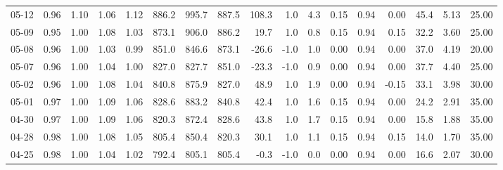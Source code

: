 \begin{threeparttable}
{\begin{tabular}{lrrrrrrrrrrrrrrrr}
  05-12 &         0.96 &           1.10 &          1.06 &          1.12 & 886.2 &  995.7 & 887.5 &      108.3 &                      1.0 &                 4.3 &       0.15 &      0.94 &           0.00 &             45.4 &            5.13 &                  25.00 \\
  05-09 &         0.95 &           1.00 &          1.08 &          1.03 & 873.1 &  906.0 & 886.2 &       19.7 &                      1.0 &                 0.8 &       0.15 &      0.94 &           0.15 &             32.2 &            3.60 &                  25.00 \\
  05-08 &         0.96 &           1.00 &          1.03 &          0.99 & 851.0 &  846.6 & 873.1 &      -26.6 &                     -1.0 &                 1.0 &       0.00 &      0.94 &           0.00 &             37.0 &            4.19 &                  20.00 \\
  05-07 &         0.96 &           1.00 &          1.04 &          1.00 & 827.0 &  827.7 & 851.0 &      -23.3 &                     -1.0 &                 0.9 &       0.00 &      0.94 &           0.00 &             37.7 &            4.40 &                  25.00 \\
  05-02 &         0.96 &           1.00 &          1.08 &          1.04 & 840.8 &  875.9 & 827.0 &       48.9 &                      1.0 &                 1.9 &       0.00 &      0.94 &          -0.15 &             33.1 &            3.98 &                  30.00 \\
  05-01 &         0.97 &           1.00 &          1.09 &          1.06 & 828.6 &  883.2 & 840.8 &       42.4 &                      1.0 &                 1.6 &       0.15 &      0.94 &           0.00 &             24.2 &            2.91 &                  35.00 \\
  04-30 &         0.97 &           1.00 &          1.09 &          1.06 & 820.3 &  872.4 & 828.6 &       43.8 &                      1.0 &                 1.7 &       0.15 &      0.94 &           0.00 &             15.8 &            1.88 &                  35.00 \\
  04-28 &         0.98 &           1.00 &          1.08 &          1.05 & 805.4 &  850.4 & 820.3 &       30.1 &                      1.0 &                 1.1 &       0.15 &      0.94 &           0.15 &             14.0 &            1.70 &                  35.00 \\
  04-25 &         0.98 &           1.00 &          1.04 &          1.02 & 792.4 &  805.1 & 805.4 &       -0.3 &                     -1.0 &                 0.0 &       0.00 &      0.94 &           0.00 &             16.6 &            2.07 &                  30.00 \\

\end{tabular}}
\end{threeparttable}
